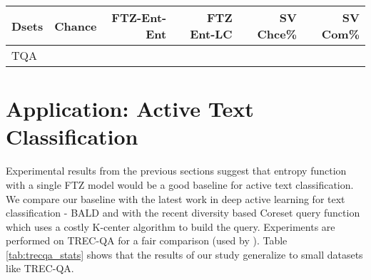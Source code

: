 \documentclass[11pt,a4paper]{article}
\begin{document}
\begin{table}[t]
\caption{Intersection of query strategies across single and ensemble of 5FTZ models. We observe that the \% intersection of samples selected by ensembles and single models is comparable to intersection among either. The 5-model committee does not seem to add any additional value over selection by a single model.} 
\label{tab:query_model}
\end{table}





 

 \begin{table*}[t]
\small\addtolength{\tabcolsep}{-3pt}
\centering
  \begin{tabular}{|l||r|r|r||r|r|}\hline
  Dsets & Chance & FTZ-Ent-Ent & FTZ Ent-LC & SV Chce\% & SV Com\% \\ \hline
  TQA &  &    &  &   &   \\ \hline
  \end{tabular}
  \caption{Results of sample selection from previous investigations on small datasets (Trec-QA).} 
  \label{tab:trecqa_stats}
\end{table*}
\section{Application: Active Text Classification}
\label{sec:comparison}
Experimental results from the previous sections suggest that entropy function with a single FTZ model would be a good baseline for active text classification. We compare our baseline with the latest work in deep active learning for text classification - BALD \cite{siddhant2018deep} and with the recent diversity based Coreset query function \cite{sener2018active} which uses a costly K-center algorithm to build the query. Experiments are performed on TREC-QA for a fair comparison (used by \cite{siddhant2018deep}).  Table \ref{tab:trecqa_stats} shows that the results of our study generalize to small datasets like TREC-QA. 
\end{document}

